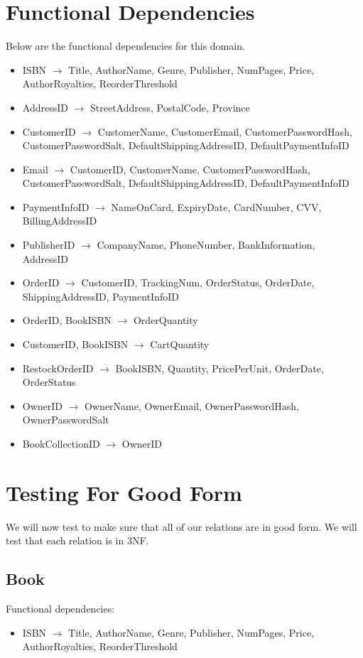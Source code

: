\documentclass{article}
\newcommand{\trightarrow}{\(\rightarrow\)}
\begin{document}
\section{Functional Dependencies}
Below are the functional dependencies for this domain.
\begin{itemize}
  \item ISBN \trightarrow{} Title, AuthorName, Genre, Publisher, NumPages, Price, AuthorRoyalties, ReorderThreshold
  \item AddressID \trightarrow{} StreetAddress, PostalCode, Province
  \item CustomerID \trightarrow{} CustomerName, CustomerEmail, CustomerPasswordHash, CustomerPasswordSalt, DefaultShippingAddressID, DefaultPaymentInfoID
  \item Email \trightarrow{} CustomerID, CustomerName, CustomerPasswordHash, CustomerPasswordSalt, DefaultShippingAddressID, DefaultPaymentInfoID
  \item PaymentInfoID \trightarrow{} NameOnCard, ExpiryDate, CardNumber, CVV, BillingAddressID
  \item PublisherID \trightarrow{} CompanyName, PhoneNumber, BankInformation, AddressID
  \item OrderID \trightarrow{} CustomerID, TrackingNum, OrderStatus, OrderDate, ShippingAddressID, PaymentInfoID
  \item OrderID, BookISBN \trightarrow{} OrderQuantity
  \item CustomerID, BookISBN \trightarrow{} CartQuantity
  \item RestockOrderID \trightarrow{} BookISBN, Quantity, PricePerUnit, OrderDate, OrderStatus
  \item OwnerID \trightarrow{} OwnerName, OwnerEmail, OwnerPasswordHash, OwnerPasswordSalt
  \item BookCollectionID \trightarrow{} OwnerID
\end{itemize}

\section{Testing For Good Form}
We will now test to make sure that all of our relations are in good form. We will test that each relation is in 3NF.
\subsection{Book}
Functional dependencies:
\begin{itemize}
  \item ISBN \trightarrow{} Title, AuthorName, Genre, Publisher, NumPages, Price, AuthorRoyalties, ReorderThreshold
\end{itemize}
\end{document}
